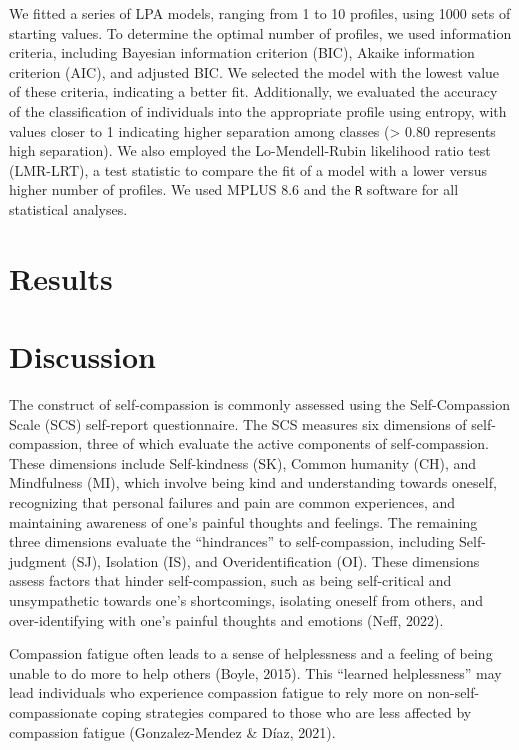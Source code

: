 \documentclass[
  man]{apa6}
\begin{document}
We fitted a series of LPA models, ranging from 1 to 10 profiles, using 1000 sets of starting values. To determine the optimal number of profiles, we used information criteria, including Bayesian information criterion (BIC), Akaike information criterion (AIC), and adjusted BIC. We selected the model with the lowest value of these criteria, indicating a better fit. Additionally, we evaluated the accuracy of the classification of individuals into the appropriate profile using entropy, with values closer to 1 indicating higher separation among classes (\textgreater{} 0.80 represents high separation). We also employed the Lo-Mendell-Rubin likelihood ratio test (LMR-LRT), a test statistic to compare the fit of a model with a lower versus higher number of profiles. We used MPLUS 8.6 and the \texttt{R} software for all statistical analyses.

\hypertarget{results}{%
\section{Results}\label{results}}

\hypertarget{discussion}{%
\section{Discussion}\label{discussion}}

The construct of self-compassion is commonly assessed using the Self-Compassion Scale (SCS) self-report questionnaire. The SCS measures six dimensions of self-compassion, three of which evaluate the active components of self-compassion. These dimensions include Self-kindness (SK), Common humanity (CH), and Mindfulness (MI), which involve being kind and understanding towards oneself, recognizing that personal failures and pain are common experiences, and maintaining awareness of one's painful thoughts and feelings. The remaining three dimensions evaluate the ``hindrances'' to self-compassion, including Self-judgment (SJ), Isolation (IS), and Overidentification (OI). These dimensions assess factors that hinder self-compassion, such as being self-critical and unsympathetic towards one's shortcomings, isolating oneself from others, and over-identifying with one's painful thoughts and emotions (Neff, 2022).

Compassion fatigue often leads to a sense of helplessness and a feeling of being unable to do more to help others (Boyle, 2015). This ``learned helplessness'' may lead individuals who experience compassion fatigue to rely more on non-self-compassionate coping strategies compared to those who are less affected by compassion fatigue (Gonzalez-Mendez \& Díaz, 2021).
\end{document}
